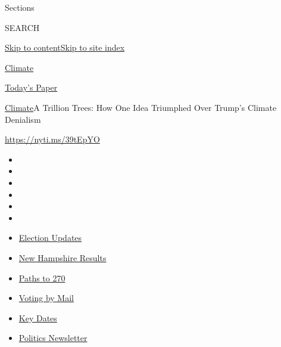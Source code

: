 Sections

SEARCH

\protect\hyperlink{site-content}{Skip to
content}\protect\hyperlink{site-index}{Skip to site index}

\href{https://www.nytimes3xbfgragh.onion/section/climate}{Climate}

\href{https://myaccount.nytimes3xbfgragh.onion/auth/login?response_type=cookie\&client_id=vi}{}

\href{https://www.nytimes3xbfgragh.onion/section/todayspaper}{Today's
Paper}

\href{/section/climate}{Climate}\textbar{}A Trillion Trees: How One Idea
Triumphed Over Trump's Climate Denialism

\url{https://nyti.ms/39tEpYO}

\begin{itemize}
\item
\item
\item
\item
\item
\item
\end{itemize}

\begin{itemize}
\item
  \href{https://www.nytimes3xbfgragh.onion/live/2020/09/09/us/trump-vs-biden?action=click\&pgtype=Article\&state=default\&region=TOP_BANNER\&context=storylines_menu}{Election
  Updates}
\item
  \href{https://www.nytimes3xbfgragh.onion/interactive/2020/09/08/us/elections/results-new-hampshire-primary-elections.html?action=click\&pgtype=Article\&state=default\&region=TOP_BANNER\&context=storylines_menu}{New
  Hampshire Results}
\item
  \href{https://www.nytimes3xbfgragh.onion/interactive/2020/us/elections/election-states-biden-trump.html?action=click\&pgtype=Article\&state=default\&region=TOP_BANNER\&context=storylines_menu}{Paths
  to 270}
\item
  \href{https://www.nytimes3xbfgragh.onion/interactive/2020/08/31/us/politics/vote-by-mail-deadlines.html?action=click\&pgtype=Article\&state=default\&region=TOP_BANNER\&context=storylines_menu}{Voting
  by Mail}
\item
  \href{https://www.nytimes3xbfgragh.onion/interactive/2019/us/elections/2020-presidential-election-calendar.html?action=click\&pgtype=Article\&state=default\&region=TOP_BANNER\&context=storylines_menu}{Key
  Dates}
\item
  \href{https://www.nytimes3xbfgragh.onion/newsletters/politics?action=click\&pgtype=Article\&state=default\&region=TOP_BANNER\&context=storylines_menu}{Politics
  Newsletter}
\end{itemize}


